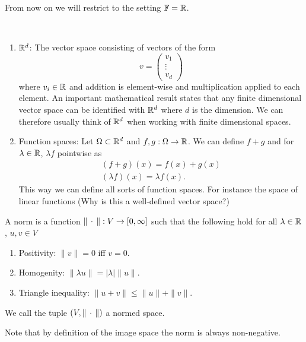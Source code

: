 From now on we will restrict to the setting $\mathbb{F} = \mathbb{R}$.
\begin{example}\
    \begin{enumerate}
        \item $\mathbb{R}^d$: The vector space consisting of vectors of the form 
        \begin{equation}
            v = \begin{pmatrix}
                v_1\\
                \vdots\\
                v_d
            \end{pmatrix}
        \end{equation}
        where $v_i\in \mathbb{R}$ and addition is element-wise and multiplication applied to each element. An important mathematical result states that any finite dimensional vector space can be identified with $\mathbb{R}^d$ where $d$ is the dimension. We can therefore usually think of $\mathbb{R}^d$ when working with finite dimensional spaces.
        \item Function spaces: Let $\Omega\subset\mathbb{R}^d$ and $f,g:\Omega\rightarrow \mathbb{R}$. We can define $f+g$ and for $\lambda\in \mathbb{R}$, $\lambda f$ pointwise as
        \begin{gather}
            (f+g)(x) = f(x) + g(x)\\
            (\lambda f)(x) = \lambda f(x).
        \end{gather}
        This way we can define all sorts of function spaces. For instance the space of linear functions (Why is this a well-defined vector space?)
    \end{enumerate}    
\end{example}


\begin{defn}[Norm]
    A norm is a function $\|\,\cdot\,\|:V\rightarrow [0,\infty]$ such that the following hold for all $\lambda\in \mathbb{R}$, $u,v\in V$
    \begin{enumerate}
        \item Positivity: $\|v\| = 0$ iff $v=0$.
        \item Homogenity: $\|\lambda u\| = |\lambda|\| u\|$.
        \item Triangle inequality: $\|u+v\|\leq \|u\| + \|v\|$.
    \end{enumerate}
    We call the tuple $(V,\|\,\cdot\,\|)$ a normed space.
\end{defn}
\begin{rem}
    Note that by definition of the image space the norm is always non-negative.
\end{rem}

